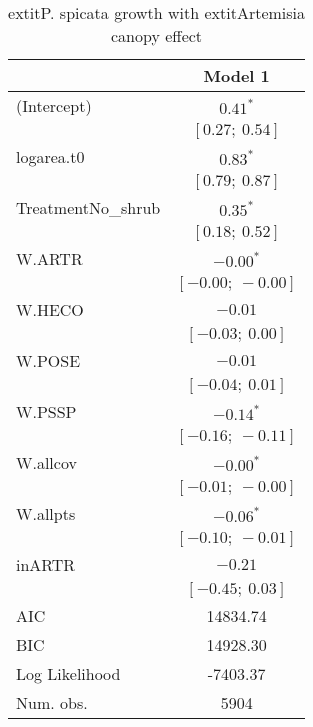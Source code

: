 \begin{table}
\caption{	extit{P. spicata} growth with 	extit{Artemisia} canopy effect}
\begin{center}
\begin{tabular}{l c }
\hline
 & Model 1 \\
\hline
(Intercept)                      & $0.41^{*}$        \\
                                 & $[0.27;\ 0.54]$   \\
logarea.t0                       & $0.83^{*}$        \\
                                 & $[0.79;\ 0.87]$   \\
TreatmentNo\_shrub               & $0.35^{*}$        \\
                                 & $[0.18;\ 0.52]$   \\
W.ARTR                           & $-0.00^{*}$       \\
                                 & $[-0.00;\ -0.00]$ \\
W.HECO                           & $-0.01$           \\
                                 & $[-0.03;\ 0.00]$  \\
W.POSE                           & $-0.01$           \\
                                 & $[-0.04;\ 0.01]$  \\
W.PSSP                           & $-0.14^{*}$       \\
                                 & $[-0.16;\ -0.11]$ \\
W.allcov                         & $-0.00^{*}$       \\
                                 & $[-0.01;\ -0.00]$ \\
W.allpts                         & $-0.06^{*}$       \\
                                 & $[-0.10;\ -0.01]$ \\
inARTR                           & $-0.21$           \\
                                 & $[-0.45;\ 0.03]$  \\
\hline
AIC                              & 14834.74          \\
BIC                              & 14928.30          \\
Log Likelihood                   & -7403.37          \\
Num. obs.                        & 5904              \\

\end{tabular}
\end{center}
\end{table}
